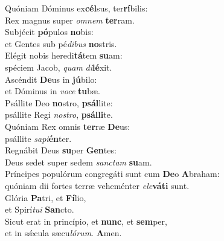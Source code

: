 \evenverse Quóniam Dóminus ex\textbf{cél}sus, ter\textbf{rí}bilis:~\*\\
\evenverse Rex magnus super \textit{om}\textit{nem} \textbf{ter}ram.\\
\oddverse Subjécit \textbf{pó}pulos \textbf{no}bis:~\*\\
\oddverse et Gentes sub pé\textit{di}\textit{bus} \textbf{no}stris.\\
\evenverse Elégit nobis heredi\textbf{tá}tem \textbf{su}am:~\*\\
\evenverse spéciem Jacob, \textit{quam} \textit{di}\textbf{lé}xit.\\
\oddverse Ascéndit \textbf{De}us in \textbf{jú}bilo:~\*\\
\oddverse et Dóminus in \textit{vo}\textit{ce} \textbf{tu}bæ.\\
\evenverse Psállite Deo \textbf{no}stro, \textbf{psál}lite:~\*\\
\evenverse psállite Regi \textit{no}\textit{stro}, \textbf{psál}\textbf{li}te.\\
\oddverse Quóniam Rex omnis \textbf{ter}ræ \textbf{De}us:~\*\\
\oddverse psállite \textit{sa}\textit{pi}\textbf{én}ter.\\
\evenverse Regnábit Deus \textbf{su}per \textbf{Gen}tes:~\*\\
\evenverse Deus sedet super sedem \textit{san}\textit{ctam} \textbf{su}am.\\
\oddverse Príncipes populórum congregáti sunt cum \textbf{De}o \textbf{A}braham:~\*\\
\oddverse quóniam dii fortes terræ veheménter \textit{e}\textit{le}\textbf{vá}\textbf{ti} sunt.\\
\evenverse Glória \textbf{Pa}tri, et \textbf{Fí}lio,~\*\\
\evenverse et Spirí\textit{tu}\textit{i} \textbf{San}cto.\\
\oddverse Sicut erat in princípio, et \textbf{nunc}, et \textbf{sem}per,~\*\\
\oddverse et in sǽcula sæcu\textit{ló}\textit{rum}. \textbf{A}men.\\
